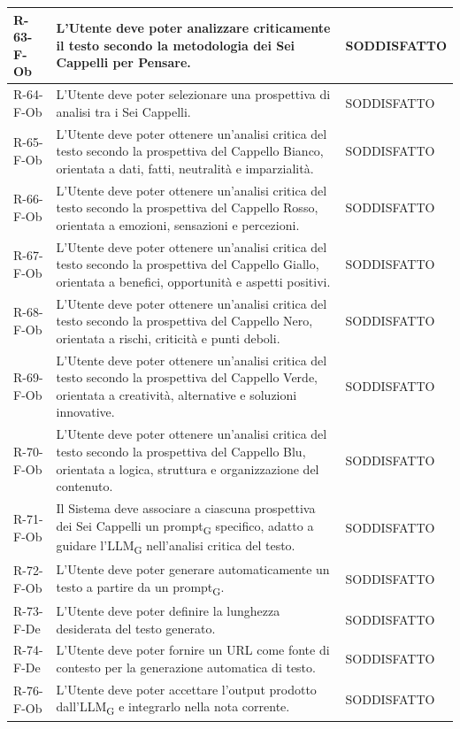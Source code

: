 \documentclass[a4paper, 10pt]{article}
\begin{document}
\begin{longtable}{|p{2.1cm}|p{9.6cm}|p{2.6cm}|}
    R-63-F-Ob & L'Utente deve poter analizzare criticamente il testo secondo la metodologia dei Sei Cappelli per Pensare. & SODDISFATTO \\ \hline
    R-64-F-Ob & L'Utente deve poter selezionare una prospettiva di analisi tra i Sei Cappelli. & SODDISFATTO \\ \hline
    R-65-F-Ob & L'Utente deve poter ottenere un'analisi critica del testo secondo la prospettiva del Cappello Bianco, orientata a dati, fatti, neutralità e imparzialità. & SODDISFATTO \\ \hline
    R-66-F-Ob & L'Utente deve poter ottenere un'analisi critica del testo secondo la prospettiva del Cappello Rosso, orientata a emozioni, sensazioni e percezioni. & SODDISFATTO \\ \hline
    R-67-F-Ob & L'Utente deve poter ottenere un'analisi critica del testo secondo la prospettiva del Cappello Giallo, orientata a benefici, opportunità e aspetti positivi. & SODDISFATTO \\ \hline
    R-68-F-Ob & L'Utente deve poter ottenere un'analisi critica del testo secondo la prospettiva del Cappello Nero, orientata a rischi, criticità e punti deboli. & SODDISFATTO \\ \hline
    R-69-F-Ob & L'Utente deve poter ottenere un'analisi critica del testo secondo la prospettiva del Cappello Verde, orientata a creatività, alternative e soluzioni innovative. & SODDISFATTO \\ \hline
    R-70-F-Ob & L'Utente deve poter ottenere un'analisi critica del testo secondo la prospettiva del Cappello Blu, orientata a logica, struttura e organizzazione del contenuto. & SODDISFATTO \\ \hline
    R-71-F-Ob & Il Sistema deve associare a ciascuna prospettiva dei Sei Cappelli un prompt\textsubscript{G} specifico, adatto a guidare l'LLM\textsubscript{G} nell'analisi critica del testo. & SODDISFATTO \\ \hline
    R-72-F-Ob & L'Utente deve poter generare automaticamente un testo a partire da un prompt\textsubscript{G}. & SODDISFATTO \\ \hline
    R-73-F-De & L'Utente deve poter definire la lunghezza desiderata del testo generato. & SODDISFATTO \\ \hline
    R-74-F-De & L'Utente deve poter fornire un URL come fonte di contesto per la generazione automatica di testo. & SODDISFATTO \\ \hline
    R-76-F-Ob & L'Utente deve poter accettare l'output prodotto dall'LLM\textsubscript{G} e integrarlo nella nota corrente. & SODDISFATTO \\ \hline

\end{longtable}
\end{document}
